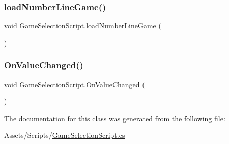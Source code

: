 \mbox{\label{classGameSelectionScript_a30ede88539b295f2ad9c8d5ff5b4f7fa}} 
\subsubsection{\texorpdfstring{load\+Number\+Line\+Game()}{loadNumberLineGame()}}
{\footnotesize\ttfamily void Game\+Selection\+Script.\+load\+Number\+Line\+Game (\begin{DoxyParamCaption}{ }\end{DoxyParamCaption})\hspace{0.3cm}{\ttfamily [inline]}}

\mbox{\label{classGameSelectionScript_aa8b90a1e8c5c5c1ea56d8d7494f1fa56}} 
\subsubsection{\texorpdfstring{On\+Value\+Changed()}{OnValueChanged()}}
{\footnotesize\ttfamily void Game\+Selection\+Script.\+On\+Value\+Changed (\begin{DoxyParamCaption}{ }\end{DoxyParamCaption})\hspace{0.3cm}{\ttfamily [inline]}}



The documentation for this class was generated from the following file\+:\begin{DoxyCompactItemize}
\item 
Assets/\+Scripts/\hyperlink{GameSelectionScript_8cs}{Game\+Selection\+Script.\+cs}\end{DoxyCompactItemize}
